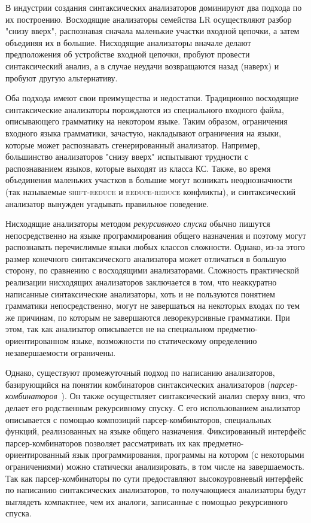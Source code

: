 В индустрии создания синтаксических анализаторов доминируют два подхода по их построению. Восходящие анализаторы семейства LR осуществляют разбор "снизу вверх", распознавая сначала маленькие участки входной цепочки, а затем объединяя их в большие. Нисходящие анализаторы вначале делают предположения об устройстве входной цепочки,  пробуют провести синтаксический анализ, а в случае неудачи возвращаются назад (наверх) и пробуют другую альтернативу. 


Оба подхода имеют свои преимущества и недостатки. Традиционно восходящие синтаксические анализаторы порождаются из специального входного файла, описывающего грамматику на некотором языке. Таким образом, ограничения входного языка грамматики, зачастую, накладывают ограничения на языки, которые может распознавать сгенерированный анализатор. Например, большинство анализаторов "снизу вверх" испытывают трудности с распознаванием языков, которые выходят из класса КС. Также, во время объединения маленьких участков в большие могут возникать неоднозначности (так называемые \textsc{shift-reduce} и \textsc{reduce-reduce} конфликты), и синтаксический анализатор вынужден угадывать правильное поведение.

Нисходящие анализаторы методом \emph{рекурсивного спуска} обычно пишутся непосредственно на языке программирования общего назначения и поэтому могут распознавать перечислимые языки любых классов сложности. Однако, из-за этого размер конечного синтаксического анализатора может отличаться в большую сторону, по сравнению с восходящими анализаторами.
Сложность практической реализации нисходящих анализаторов заключается в том, что неаккуратно написанные синтаксические анализаторы, хоть и не пользуются понятием грамматики непосредственно, могут не завершаться на некоторых входах по тем же причинам, по которым не завершаются леворекурсивные грамматики. При этом, так как анализатор описывается не на специальном предметно-ориентированном языке, возможности по статическому определению незавершаемости ограничены.

Однако, существуют промежуточный подход по написанию анализаторов, базирующийся на понятии комбинаторов синтаксических анализаторов (\emph{парсер-комбинаторов}~\cite{monparsing}). 
Он также осуществляет синтаксический анализ сверху вниз, что делает его родственным рекурсивному спуску. С его использованием анализатор описывается с помощью композиций парсер-комбинаторов, специальных функций, реализованных на языке общего назначения. Фиксированный интерфейс парсер-комбинаторов позволяет рассматривать их как предметно-ориентиро\-ван\-ный язык программирования, программы на котором (с некоторыми ограничениями) можно статически анализировать, в том числе на завершаемость. Так как парсер-комбинаторы по сути предоставляют высокоуровневый интерфейс по написанию синтаксических анализаторов, то получающиеся анализаторы будут выглядеть компактнее, чем их аналоги, записанные с помощью рекурсивного спуска.


